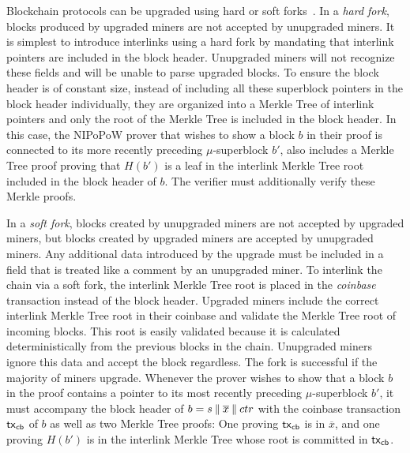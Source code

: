 Blockchain protocols can be upgraded using hard or soft
forks~\cite{buterinforks}. In a \emph{hard fork}, blocks produced by
upgraded miners are not accepted by unupgraded miners. It is simplest to
introduce interlinks using a hard fork by mandating that interlink pointers are
included in the block header. Unupgraded miners will not
recognize these fields and will be unable to parse upgraded blocks.
To ensure the block header is of constant size, instead of including all these
superblock pointers in the block header individually, they are organized into a
Merkle Tree of interlink pointers and only the root of the Merkle Tree is
included in the block header. In this case, the NIPoPoW prover that wishes to
show a block $b$ in their proof is connected to its more recently preceding
$\mu$-superblock $b'$, also includes a Merkle Tree proof proving that $H(b')$ is
a leaf in the interlink Merkle Tree root included in the block header of $b$.
The verifier must additionally verify these Merkle proofs.

In a \emph{soft fork}, blocks created by unupgraded miners are not accepted by
upgraded miners, but blocks created by upgraded miners are accepted by
unupgraded miners. Any additional data introduced by the upgrade must
be included in a field that is treated like a comment by an unupgraded miner.
To interlink the chain via a soft fork, the interlink Merkle Tree root is
placed in the \emph{coinbase} transaction instead of the block header. Upgraded
miners include the correct interlink Merkle Tree root in their coinbase and validate
the Merkle Tree root of incoming blocks.
This root is easily validated because it is
calculated deterministically from the previous blocks in the chain.
Unupgraded miners ignore this data and accept the block
regardless. The fork is successful if the majority of miners upgrade.
Whenever the prover wishes to show that a
block $b$ in the proof contains a pointer to its most recently preceding
$\mu$-superblock $b'$, it must accompany the block header of $b = s \mathbin{\|}
\overline{x} \mathbin{\|} ctr$ with the coinbase transaction $\mathsf{tx}_{\mathsf{cb}}$ of $b$ as well
as two Merkle Tree proofs: One proving $\mathsf{tx}_{\mathsf{cb}}$
is in $\overline{x}$, and one proving $H(b')$ is in the interlink
Merkle Tree whose root is committed in $\mathsf{tx}_{\mathsf{cb}}$.